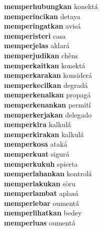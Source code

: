 \textbf{memperhubungkan } konektá \\
\textbf{memperincikan } detaya \\
\textbf{memperingatkan } avisá \\
\textbf{memperisteri } casa \\
\textbf{memperjelas } aklará \\
\textbf{memperjudikan } chèns \\
\textbf{memperkaitkan } konektá \\
\textbf{memperkarakan } konsiderá \\
\textbf{memperkecilkan } degradá \\
\textbf{memperkenalkan } propagá \\
\textbf{memperkenankan } permití \\
\textbf{memperkerjakan } delegado \\
\textbf{memperkira } kalkulá \\
\textbf{memperkirakan } kalkulá \\
\textbf{memperkosa } ataká \\
\textbf{memperkuat } sigurá \\
\textbf{memperkukuh } spierta \\
\textbf{memperlahankan } kontrolá \\
\textbf{memperlakukan } sòru \\
\textbf{memperlambat } aplasá \\
\textbf{memperlebar } oumentá \\
\textbf{memperlihatkan } bedey \\
\textbf{memperluas } oumentá \\
